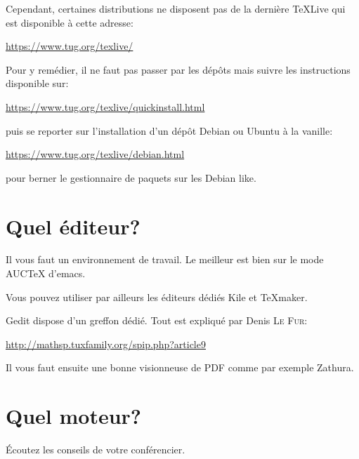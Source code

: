 Cependant,   certaines   distributions  ne   disposent   pas   de  la   dernière
\TeX{}Live qui est disponible à cette adresse:


\begin{center}
  \href{https://www.tug.org/texlive/}{https://www.tug.org/texlive/}
\end{center}

 Pour y remédier, il ne faut pas passer par les dépôts mais suivre
les instructions disponible sur:

\begin{center}
\href{https://www.tug.org/texlive/quickinstall.html}{https://www.tug.org/texlive/quickinstall.html}
\end{center}

puis  se reporter  sur  l'installation d'un  dépôt  Debian ou  Ubuntu  \og à  la
vanille\fg{}:

\begin{center}
\href{https://www.tug.org/texlive/debian.html}{https://www.tug.org/texlive/debian.html}
\end{center}

pour berner le gestionnaire de paquets sur les \og Debian like\fg{}.


\section{Quel éditeur?}

Il vous  faut un  environnement de  travail. Le  meilleur est  bien sur  le mode
AUC\TeX{} d'emacs.

Vous pouvez utiliser par ailleurs les éditeurs dédiés Kile et \TeX{}maker. 

Gedit dispose d'un greffon dédié. Tout est expliqué par Denis \textsc{Le Fur}:

\begin{center}
  \href{http://mathsp.tuxfamily.org/spip.php?article9}{http://mathsp.tuxfamily.org/spip.php?article9}
\end{center}



Il vous faut ensuite une bonne visionneuse de PDF comme par exemple Zathura.

\section{Quel moteur?}

Écoutez les conseils de votre conférencier.








